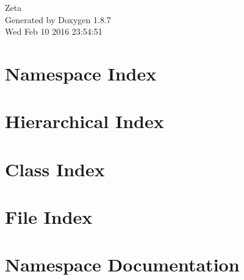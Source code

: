 \documentclass[twoside]{book}
\newcommand{\+}{\discretionary{\mbox{\scriptsize$\hookleftarrow$}}{}{}}
\newcommand{\clearemptydoublepage}{%
  \newpage{\pagestyle{empty}\cleardoublepage}%
}
\begin{document}
\hypersetup{pageanchor=false,
             bookmarks=true,
             bookmarksnumbered=true,
             pdfencoding=unicode
            }
\begin{titlepage}
\vspace*{7cm}
\begin{center}%
{\Large Zeta }\\
\vspace*{1cm}
{\large Generated by Doxygen 1.8.7}\\
\vspace*{0.5cm}
{\small Wed Feb 10 2016 23:54:51}\\
\end{center}
\end{titlepage}
\clearemptydoublepage
\tableofcontents
\clearemptydoublepage
{}
\hypersetup{pageanchor=true}

\chapter{Namespace Index}

\chapter{Hierarchical Index}

\chapter{Class Index}

\chapter{File Index}

\chapter{Namespace Documentation}



\end{document}
